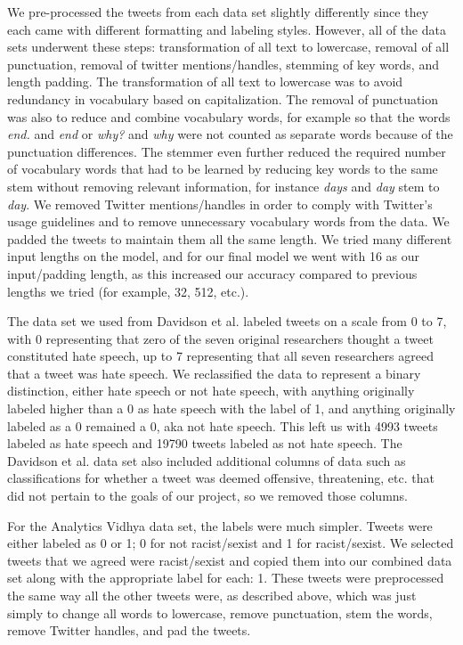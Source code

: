 \documentclass[conference]{sig-alternate-05-2015}
\begin{document}
We pre-processed the tweets from each data set slightly differently since they each came with different formatting and labeling styles. However, all of the data sets underwent these steps: transformation of all text to lowercase, removal of all punctuation, removal of twitter mentions/handles, stemming of key words, and length padding. The transformation of all text to lowercase was to avoid redundancy in vocabulary based on capitalization. The removal of punctuation was also to reduce and combine vocabulary words, for example so that the words \textit{end.} and \textit{end} or \textit{why?} and \textit{why} were not counted as separate words because of the punctuation differences. The stemmer even further reduced the required number of vocabulary words that had to be learned by reducing key words to the same stem without removing relevant information, for instance \textit{days} and \textit{day} stem to \textit{day}. We removed Twitter mentions/handles in order to comply with Twitter's usage guidelines and to remove unnecessary vocabulary words from the data. We padded the tweets to maintain them all the same length. We tried many different input lengths on the model, and for our final model we went with 16 as our input/padding length, as this increased our accuracy compared to previous lengths we tried (for example, 32, 512, etc.). 


The data set we used from Davidson et al. labeled tweets on a scale from 0 to 7, with 0 representing that zero of the seven original researchers thought a tweet constituted hate speech, up to 7 representing that all seven researchers agreed that a tweet was hate speech. We reclassified the data to represent a binary distinction, either hate speech or not hate speech, with anything originally labeled higher than a 0 as hate speech with the label of 1, and anything originally labeled as a 0 remained a 0, aka not hate speech. This left us with 4993 tweets labeled as hate speech and 19790 tweets labeled as not hate speech. The Davidson et al. data set also included additional columns of data such as classifications for whether a tweet was deemed offensive, threatening, etc. that did not pertain to the goals of our project, so we removed those columns.

For the Analytics Vidhya data set, the labels were much simpler. Tweets were either labeled as 0 or 1; 0 for not racist/sexist and 1 for racist/sexist. We selected tweets that we agreed were racist/sexist and copied them into our combined data set along with the appropriate label for each: 1. These tweets were preprocessed the same way all the other tweets were, as described above, which was just simply to change all words to lowercase, remove punctuation, stem the words, remove Twitter handles, and pad the tweets.
\end{document}
